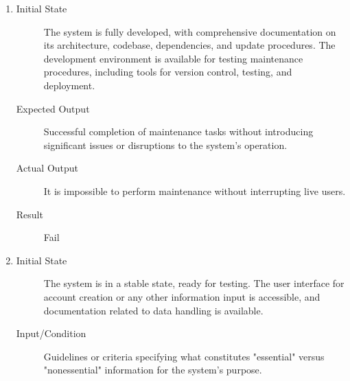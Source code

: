 \documentclass[12pt, titlepage]{article}
\begin{document}
\begin{enumerate}[NFR-T1]
  \item \label{NFRT19}
    \begin{description}
    \item[Initial State] The system is fully developed, with comprehensive
      documentation on its architecture, codebase, dependencies, and update
      procedures. The development environment is available for testing
      maintenance procedures, including tools for version control, testing, and
      deployment.
    \item[Expected Output] Successful completion of maintenance tasks without
      introducing significant issues or disruptions to the system's operation.
    \item[Actual Output] It is impossible to perform maintenance without
      interrupting live users.
    \item[Result] Fail
    \end{description}
  \addtocounter{enumi}{2}
  \item \label{NFRT22}
    \begin{description}
    \item[Initial State] The system is in a stable state, ready for testing. The
      user interface for account creation or any other information input is
      accessible, and documentation related to data handling is available.
    \item[Input/Condition] Guidelines or criteria specifying what constitutes
      "essential" versus "nonessential" information for the system’s purpose.

\end{description}
\end{enumerate}
\end{document}
